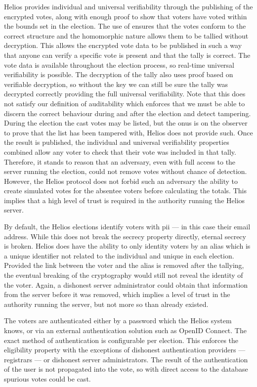 Helios provides individual and universal verifiability through the publishing of the encrypted votes, along with enough proof to show that voters have voted within the bounds set in the election. The use of  ensures that the votes conform to the correct structure and the homomorphic nature allows them to be tallied without decryption. This allows the encrypted vote data to be published in such a way that anyone can verify a specific vote is present and that the tally is correct. The vote data is available throughout the election process, so real-time universal verifiability is possible. The decryption of the tally also uses proof based on verifiable decryption, so without the key we can still be sure the tally was decrypted correctly providing the full universal verifiability. Note that this does not satisfy our definition of auditability which enforces that we must be able to discern the correct behaviour during and after the election and detect tampering. During the election the cast votes may be listed, but the onus is on the observer to prove that the list has been tampered with, Helios does not provide such. Once the result is published, the individual and universal verifiability properties combined allow any voter to check that their vote was included in that tally. Therefore, it stands to reason that an adversary, even with full access to the server running the election, could not remove votes without chance of detection. However, the Helios protocol does not forbid such an adversary the ability to create simulated votes for the absentee voters before calculating the totals. This implies that a high level of trust is required in the authority running the Helios server.

By default, the Helios elections identify voters with \gls{pii} --- in this case their email address. While this does not break the secrecy property directly, eternal secrecy is broken. Helios does have the ability to only identity voters by an alias which is a unique identifier not related to the individual and unique in each election. Provided the link between the voter and the alias is removed after the tallying, the eventual breaking of the cryptography would still not reveal the identity of the voter. Again, a dishonest server administrator could obtain that information from the server before it was removed, which implies a level of trust in the authority running the server, but not more so than already existed.

The voters are authenticated either by a password which the Helios system knows, or via an external authentication solution such as OpenID Connect. The exact method of authentication is configurable per election. This enforces the eligibility property with the exceptions of dishonest authentication providers --- registrars --- or dishonest server administrators. The result of the authentication of the user is not propagated into the vote, so with direct access to the database spurious votes could be cast.

